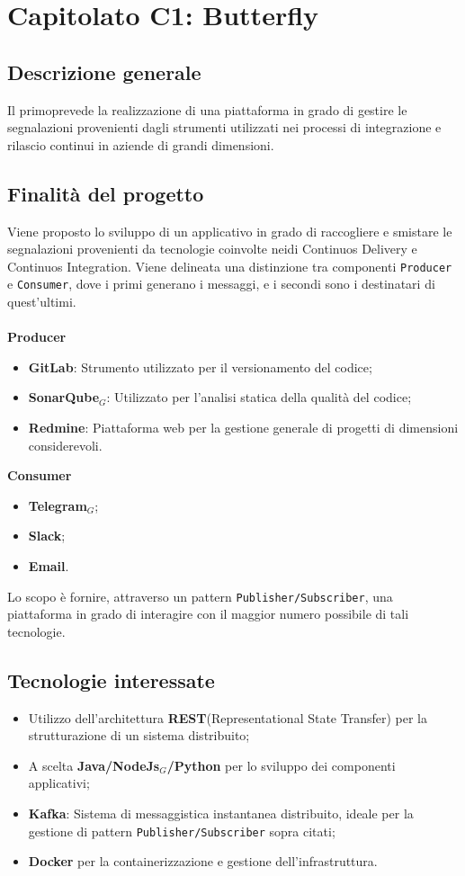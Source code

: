 \chapter{Capitolato C1: Butterfly}
\section{Descrizione generale}
Il primoprevede la realizzazione di una piattaforma in grado di gestire le segnalazioni provenienti dagli strumenti utilizzati nei processi di integrazione e rilascio continui in aziende di grandi dimensioni. 

\section{Finalit\`a del progetto}
Viene proposto lo sviluppo di un applicativo in grado di raccogliere e smistare le segnalazioni provenienti da tecnologie coinvolte neidi Continuos Delivery e Continuos Integration.
Viene delineata una distinzione tra componenti \texttt{Producer} e \texttt{Consumer}, dove i primi generano i messaggi, e i secondi sono i destinatari di quest'ultimi.\\
\\
\textbf{Producer}
	\begin{itemize}
	\item \textbf{GitLab}: Strumento utilizzato per il versionamento del codice;
	\item \textbf{SonarQube$_{G}$}: Utilizzato per l'analisi statica della qualità del codice;
	\item \textbf{Redmine}: Piattaforma web per la gestione generale di progetti di dimensioni considerevoli.
	\end{itemize}
\textbf{Consumer}
	\begin{itemize}	
		\item \textbf{Telegram$_{G}$};
		\item \textbf{Slack};
		\item \textbf{Email}.
	\end{itemize}

Lo scopo è fornire, attraverso un pattern \texttt{Publisher/Subscriber}, una piattaforma in grado di interagire con il maggior numero possibile di tali tecnologie. 	
	
	
\section{Tecnologie interessate}
	\begin{itemize}
		\item Utilizzo dell'architettura \textbf{REST}(Representational State Transfer) per la strutturazione di un sistema distribuito;
		\item A scelta \textbf{Java/NodeJs$_{G}$/Python} per lo sviluppo dei componenti applicativi;
		\item \textbf{Kafka}: Sistema di messaggistica instantanea distribuito, ideale per la gestione di pattern \texttt{Publisher/Subscriber} sopra citati;
		\item \textbf{Docker} per la containerizzazione e gestione dell'infrastruttura.
	\end{itemize}


